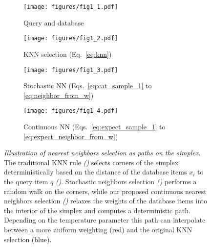 \documentclass{article}
\begin{document}
 \begin{figure*}[t]
\begin{center}
\begin{subfigure}[b]{0.18\textwidth}
	\centering
	\texttt{[image: figures/fig1\_1.pdf]}
	\caption{Query and database}
	\label{fig:fig1_query_db}
	\end{subfigure}
	\hfill
	\begin{subfigure}[b]{0.26\textwidth}
	{\texttt{[image: figures/fig1\_2.pdf]}}
	\caption{KNN selection (Eq.~\ref{eq:knn})}
	\label{fig:fig1_knn}
	\end{subfigure}
	\hfill
	\begin{subfigure}[b]{0.26\textwidth}
	\texttt{[image: figures/fig1\_3.pdf]}
	\caption{Stochastic NN (Eqs.~\ref{eq:cat_sample_1} to \ref{eq:neighbor_from_w})}
	\label{fig:fig1_snn}
	\end{subfigure}
	\hfill
	\begin{subfigure}[b]{0.26\textwidth}
	\texttt{[image: figures/fig1\_4.pdf]}
	\caption{Continuous NN (Eqs.~\ref{eq:expect_sample_1} to \ref{eq:expect_neighbor_from_w})}
	\label{fig:fig1_cnn}
	\end{subfigure}
\end{center}
   \caption{\emph{Illustration of nearest neighbors selection as paths on the simplex.} 
   The traditional KNN rule \emph{()} selects corners of the simplex deterministically based on the distance of the database items $x_i$ to the query item $q$ \emph{()}.
   Stochastic neighbors selection \emph{()} performs a random walk on the corners, while our proposed continuous nearest neighbors selection \emph{()} relaxes the weights of the database items into the interior of the simplex and computes a deterministic path. 
   Depending on the temperature parameter this path can interpolate between a more uniform weighting (red) and the original KNN selection (blue).}
\label{fig:fig1}
\vspace{-0.5em}
\end{figure*}
\end{document}

